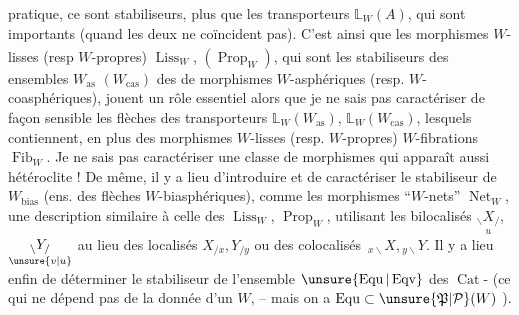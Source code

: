pratique, ce sont  stabiliseurs, plus que les
transporteurs $\mathbb L_W(A)$, qui sont importants (quand
les deux ne coïncident pas). C'est ainsi que
les morphismes $W$-lisses (resp\textsuperscript{} $W$-propres)
$\operatorname{Liss}_W$, $(\operatorname{Prop}_W)$, qui sont les stabiliseurs des
ensembles $W_{\mathrm{as}}$ $(W_{\mathrm{cas}})$ des  de morphismes
$W$-asphériques (resp. $W$-coasphériques),
jouent un rôle essentiel alors que je ne
sais pas caractériser de façon sensible les
flèches des transporteurs $\mathbb L_W(W_{\mathrm{as}})$, $\mathbb L_W(W_{\mathrm{cas}})$,
lesquels contiennent, en plus des morphismes
$W$-lisses (resp. $W$-propres)  $W$-fibrations
$\operatorname{Fib}_W$. Je ne sais pas  caractériser une
classe de morphismes qui apparaît aussi
hétéroclite ! De même, il y a lieu
d'introduire et de caractériser le
stabiliseur de $W_{\mathrm{bias}}$ (ens. des flèches
$W$-biasphériques), comme les morphismes
``$W$-nets'' $\operatorname{Net}_W$,  une description
similaire à celle des $\operatorname{Liss}_W$, $\operatorname{Prop}_W$,
utilisant les bilocalisés $\underset{u}{{}_{\backslash}X_{/}}$, $\underset{\unsure{v|u}}{{}_{\backslash}Y_{/}}$ au lieu
des localisés $X_{/x},Y_{/y}$ ou des colocalisés
$\,{}_{x\backslash}X,{}_{y\backslash}Y$. Il y a lieu enfin de déterminer
le stabiliseur de l'ensemble $\unsure{\operatorname{Equ}|\operatorname{Eqv}}$ des
$\operatorname{Cat}$- (ce qui ne dépend pas de la
donnée d'un $W$\unsure{)}, -- mais on a $\operatorname{Equ}\subset\unsure{\mathfrak{P}|\mathcal{P}}(W)$
).
